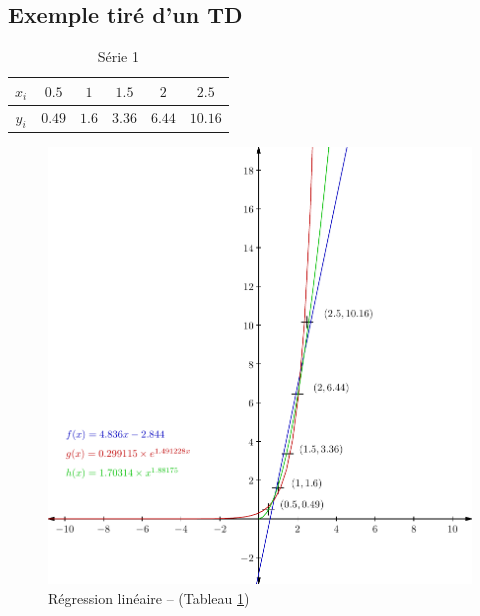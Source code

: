 \documentclass{report}
\begin{document}
      \subsection{Exemple tiré d'un TD}
	\begin{table}[h]
	  \centering
	  \begin{tabular}{| c | c | c | c | c | c |}
	    \hline 
	    $x_{i}$ & $0.5$ & $1$ & $1.5$ & $2$ & $2.5$ \\ 
	    \hline 
	    $y_{i}$ & $0.49$ & $1.6$ & $3.36$ & $6.44$ & $10.16$ \\ 
	    \hline 
	  \end{tabular}
	  \caption{Série 1}
	  \label{approx_td3_ex6}
	\end{table}
	\begin{figure}[h]
	  \centering
	  \includegraphics{graphiques/pdf_output/reglin.pdf}
	  \caption{Régression linéaire -- (Tableau \ref{approx_td3_ex6})}
	\end{figure}
      \newpage
\end{document}
